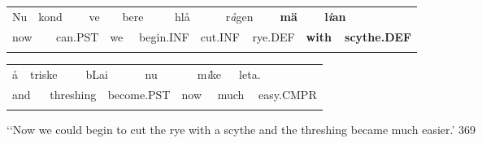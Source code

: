 \begin{tabular}{llllllllllllllll}
\lsptoprule
Nu & \multicolumn{2}{l}{kond

} & \multicolumn{2}{l}{ve

} & \multicolumn{2}{l}{bere

} & \multicolumn{2}{l}{hlå

} & \multicolumn{2}{l}{r\textit{å}gen

} & \multicolumn{2}{l}{{\bfseries mä}

} & \multicolumn{2}{l}{\textbf{l}\textbf{\textit{i}}\textbf{an}

} & \\
\multicolumn{2}{l}{now

} & \multicolumn{2}{l}{can.PST

} & \multicolumn{2}{l}{we

} & \multicolumn{2}{l}{begin.INF

} & \multicolumn{2}{l}{cut.INF

} & \multicolumn{2}{l}{rye.DEF

} & \multicolumn{2}{l}{{\bfseries with}

} & \multicolumn{2}{l}{{\bfseries scythe.DEF}

}\\
\lspbottomrule
\end{tabular}

\begin{tabular}{llllllllllll}
\lsptoprule
å & \multicolumn{2}{l}{triske

} & \multicolumn{2}{l}{bLai

} & \multicolumn{2}{l}{nu

} & \multicolumn{2}{l}{m\textit{i}ke

} & \multicolumn{2}{l}{leta.

} & \\
\multicolumn{2}{l}{and

} & \multicolumn{2}{l}{threshing

} & \multicolumn{2}{l}{become.PST

} & \multicolumn{2}{l}{now

} & \multicolumn{2}{l}{much 

} & \multicolumn{2}{l}{easy.CMPR

}\\
\lspbottomrule
\end{tabular}

\begin{styleTranslation}
‘‘Now we could begin to cut the rye with a scythe and the threshing became much easier.’ 369

\end{styleTranslation}

